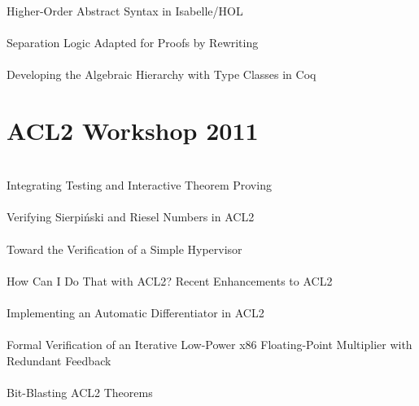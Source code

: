 \documentclass{article}
\begin{document}
\cite{10-howe-hoas} \\
Higher-Order Abstract Syntax in {Isabelle/HOL} \\

\cite{10-myreen-separation} \\
Separation Logic Adapted for Proofs by Rewriting \\

\cite{10-spitters-hierarchy} \\
Developing the Algebraic Hierarchy with Type Classes in {Coq} \\


\section{ACL2 Workshop 2011}

\cite{11-chamarthi-testing} \\
Integrating Testing and Interactive Theorem Proving \\

\cite{11-cowles-sierpinski} \\
Verifying {Sierpi\'nski} and {Riesel} Numbers in {ACL2} \\

\cite{11-dahlin-hypervisor} \\
Toward the Verification of a Simple Hypervisor \\

\cite{11-kaufmann-enhancements} \\
How Can I Do That with {ACL2}?  Recent Enhancements to {ACL2} \\

\cite{11-reid-differentiator} \\
Implementing an Automatic Differentiator in {ACL2} \\

\cite{11-seidel-fp} \\
Formal Verification of an Iterative Low-Power {x86} Floating-Point Multiplier with Redundant Feedback \\

\cite{11-swords-blasting} \\
Bit-Blasting {ACL2} Theorems \\
\end{document}
